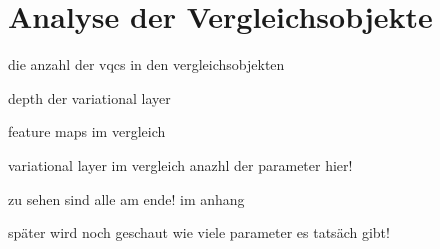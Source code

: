 \section{Analyse der Vergleichsobjekte}\label{vergleichsobjekte}

die anzahl der vqcs in den vergleichsobjekten

depth der variational layer

feature maps im vergleich

variational layer im vergleich anazhl der parameter hier!

zu sehen sind alle am ende! im anhang





später wird noch geschaut wie viele parameter es tatsäch gibt!